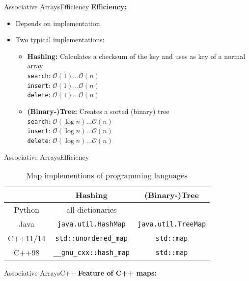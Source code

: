
\begin{frame}{Associative Arrays}{Efficiency}
  \textbf{Efficiency:}
  \begin{itemize}
    \item
      Depends on implementation
    \item
      Two typical implementations:
      \begin{itemize}
        \item
          \textbf{Hashing:}
          Calculates a checksum of the key and uses as key of a normal array\\
          \texttt{search}: $\mathcal{O}(1) \dots \mathcal{O}(n)$\\
          \texttt{insert}: $\mathcal{O}(1) \dots \mathcal{O}(n)$\\
          \texttt{delete}: $\mathcal{O}(1) \dots \mathcal{O}(n)$
        \item
          \textbf{(Binary-)Tree:}
          Creates a sorted (binary) tree\\
          \texttt{search}: $\mathcal{O}(\log n) \dots \mathcal{O}(n)$\\
          \texttt{insert}: $\mathcal{O}(\log n) \dots \mathcal{O}(n)$\\
          \texttt{delete}: $\mathcal{O}(\log n) \dots \mathcal{O}(n)$
      \end{itemize}
  \end{itemize}
\end{frame}


\begin{frame}{Associative Arrays}{Efficiency}
  \begin{table}[!h]
    \caption{Map implementions of programming languages}
    \begin{tabular}{c|cc}
      {} & Hashing & (Binary-)Tree\\
      \midrule
      Python & all dictionaries & {}\\
      Java & \texttt{java.util.HashMap} & \texttt{java.util.TreeMap}\\
      C++11/14 & \texttt{std::unordered\_map} & \texttt{std::map}\\
      C++98 & \texttt{\_\_gnu\_cxx::hash\_map} & \texttt{std::map}
    \end{tabular}
  \end{table}
\end{frame}


\begin{frame}{Associative Arrays}{C++}
  \textbf{Feature of C++ maps:}
  
\end{frame}
